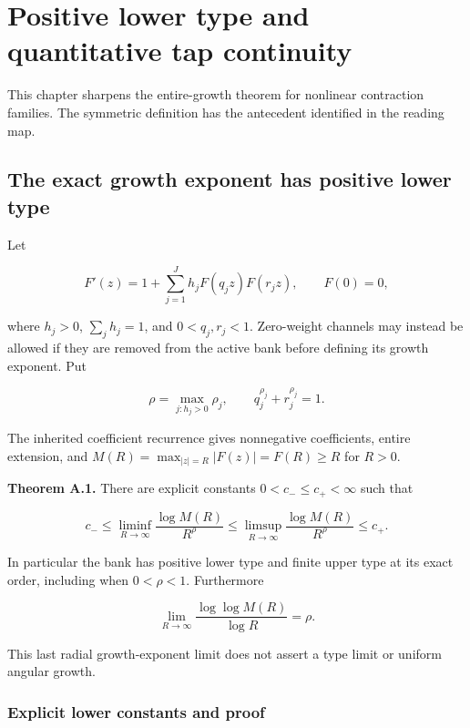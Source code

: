 \hypertarget{positive-lower-type-and-quantitative-tap-continuity}{%
\chapter[Growth and tap continuity]{Positive lower type and quantitative tap
continuity}\label{app:growth}\label{positive-lower-type-and-quantitative-tap-continuity}}

This chapter sharpens the entire-growth theorem for nonlinear contraction families. The symmetric definition has the antecedent identified in the reading map.

\hypertarget{the-exact-growth-exponent-has-positive-lower-type}{%
\section{The exact growth exponent has positive lower
type}\label{the-exact-growth-exponent-has-positive-lower-type}}

Let

\[
F'(z)=1+\sum_{j=1}^{J}h_jF(q_jz)F(r_jz),\qquad F(0)=0,
\]

where \(h_j>0\), \(\sum_jh_j=1\), and \(0<q_j,r_j<1\). Zero-weight
channels may instead be allowed if they are removed from the active bank
before defining its growth exponent. Put

\[
\rho=\max_{j:h_j>0}\rho_j,\qquad q_j^{\rho_j}+r_j^{\rho_j}=1.
\]

The inherited coefficient recurrence gives nonnegative coefficients,
entire extension, and \(M(R)=\max_{|z|=R}|F(z)|=F(R)\ge R\) for \(R>0\).

\textbf{Theorem A.1.} There are explicit constants \(0<c_-\le c_+<\infty\)
such that

\[
c_-\le\liminf_{R\to\infty}\frac{\log M(R)}{R^\rho}
\le\limsup_{R\to\infty}\frac{\log M(R)}{R^\rho}\le c_+.
\]

In particular the bank has positive lower type and finite upper type at
its exact order, including when \(0<\rho<1\). Furthermore

\[
\lim_{R\to\infty}\frac{\log\log M(R)}{\log R}=\rho.
\]

This last radial growth-exponent limit does not assert a type limit or
uniform angular growth.

\hypertarget{explicit-lower-constants-and-proof}{%
\subsection{Explicit lower constants and
proof}\label{explicit-lower-constants-and-proof}}

